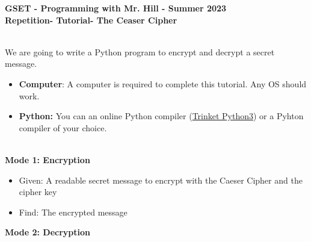 \documentclass[12pt]{article}
\newcommand{\MNUM}{7} %
\newcommand{\MNAME}{Repetition} %
\newcommand{\TNAME}{The Ceaser Cipher} %
\begin{document}
\thispagestyle{plain}

\begin{center}
   {\bf \large GSET - Programming with Mr. Hill - Summer 2023} \vspace{5mm}\\
   {\bf \Large \MNAME \hspc -  Tutorial\hspc\MNUM\hspc - \TNAME}\vspace{3mm}\\
   
\end{center}


\begin{description}[labelindent=1cm]
	
	\item[\textbf{\underline{Overview:}}] \hfill \vspace{3mm}\\
	We are going to write a Python program to encrypt and decrypt a secret message. 
	
	\item[\textbf{\underline{System Requirements:}}] \hfill \vspace{0mm}

\begin{itemize}
	\item {\bf Computer}: A computer is required to complete this tutorial. Any OS should work.
	\item {\bf Python:} You can an online Python compiler (\href{https://trinket.io/embed/python3/a5bd54189b}{Trinket Python3}) or a Pyhton compiler of your choice.
\end{itemize}

	\item[\textbf{\underline{Problem Statement:}}] \hfill \vspace{0mm} \\
	{\bf Mode 1: Encryption}
	\begin{itemize}

		\item Given: A readable secret message to encrypt with the Caeser Cipher and the cipher key
		
		\item Find: The encrypted message
		 
	\end{itemize}

	{\bf Mode 2: Decryption}
	\begin{itemize}
		

\end{itemize}
\end{description}
\end{document}
